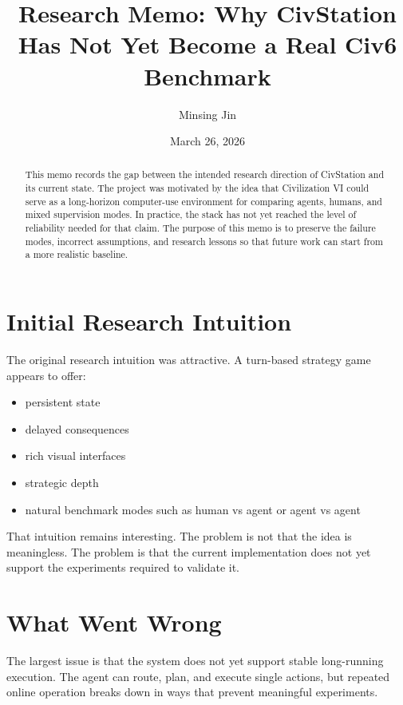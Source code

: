 \documentclass[11pt]{article}
\title{Research Memo: Why CivStation Has Not Yet Become a Real Civ6 Benchmark}
\author{Minsing Jin}
\date{March 26, 2026}
\begin{document}
\maketitle

\begin{abstract}
This memo records the gap between the intended research direction of CivStation and its current state. The project was motivated by the idea that Civilization VI could serve as a long-horizon computer-use environment for comparing agents, humans, and mixed supervision modes. In practice, the stack has not yet reached the level of reliability needed for that claim. The purpose of this memo is to preserve the failure modes, incorrect assumptions, and research lessons so that future work can start from a more realistic baseline.
\end{abstract}

\section{Initial Research Intuition}

The original research intuition was attractive. A turn-based strategy game appears to offer:
\begin{itemize}[leftmargin=*]
    \item persistent state
    \item delayed consequences
    \item rich visual interfaces
    \item strategic depth
    \item natural benchmark modes such as human vs agent or agent vs agent
\end{itemize}

That intuition remains interesting. The problem is not that the idea is meaningless. The problem is that the current implementation does not yet support the experiments required to validate it.

\section{What Went Wrong}

The largest issue is that the system does not yet support stable long-running execution. The agent can route, plan, and execute single actions, but repeated online operation breaks down in ways that prevent meaningful experiments.
\end{document}
